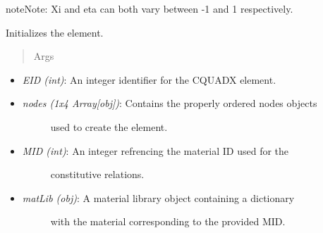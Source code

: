 \documentclass[letterpaper,10pt,english]{sphinxmanual}
\begin{document}
\begin{fulllineitems}
\begin{fulllineitems}
\begin{itemize}
\begin{description}
\end{description}

\end{itemize}

\begin{notice}{note}{Note:}
Xi and eta can both vary between -1 and 1 respectively.
\end{notice}

\end{fulllineitems}


\begin{fulllineitems}
\label{structures:AeroComBAT.Structures.CQUADX.__init__}
Initializes the element.
\begin{quote}\begin{description}
\item[{Args}] \leavevmode
\end{description}\end{quote}
\begin{itemize}
\item {} 
\emph{EID (int)}: An integer identifier for the CQUADX element.

\item {} \begin{description}
\item[{\emph{nodes (1x4 Array{[}obj{]})}: Contains the properly ordered nodes objects}] \leavevmode
used to create the element.

\end{description}

\item {} \begin{description}
\item[{\emph{MID (int)}: An integer refrencing the material ID used for the}] \leavevmode
constitutive relations.

\end{description}

\item {} \begin{description}
\item[{\emph{matLib (obj)}: A material library object containing a dictionary}] \leavevmode
with the material corresponding to the provided MID.

\end{description}


\end{itemize}
\end{fulllineitems}
\end{fulllineitems}
\end{document}
